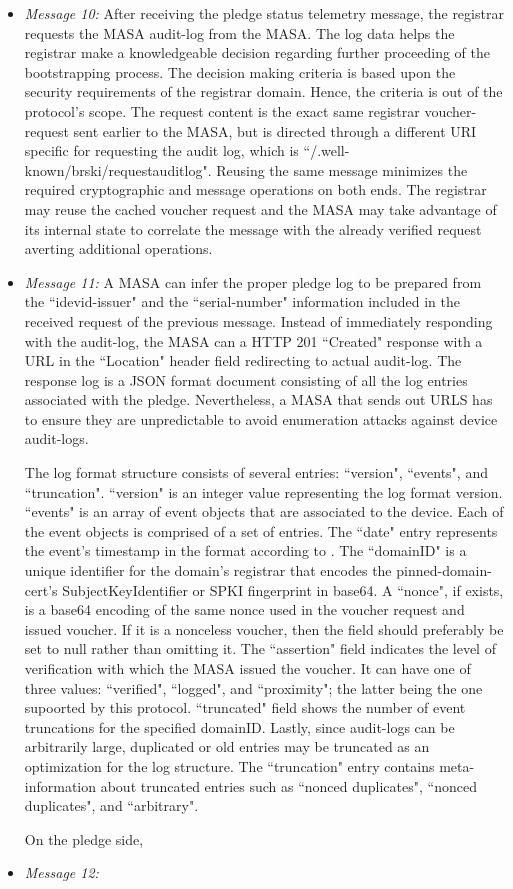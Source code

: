 \begin{itemize}
	\item \textit{Message 10:} After receiving the pledge status telemetry message, the registrar requests the MASA audit-log from the MASA. The log data helps the registrar make a knowledgeable decision regarding further proceeding of the bootstrapping process. The decision making criteria is based upon the security requirements of the registrar domain. Hence, the criteria is out of the protocol's scope.
	The request content is the exact same registrar voucher-request sent earlier to the MASA, but is directed through a different URI specific for requesting the audit log, which is ``/.well-known/brski/requestauditlog". Reusing the same message minimizes the required cryptographic and message operations on both ends. The registrar may reuse the cached voucher request and the MASA may take advantage of its internal state to correlate the message with the already verified request averting additional operations.
	
	\item \textit{Message 11:} 
	A MASA can infer the proper pledge log to be prepared from the ``idevid-issuer" and the ``serial-number" information included in the received request of the previous message. Instead of immediately responding with the audit-log, the MASA can a HTTP 201 ``Created" response with a URL in the ``Location" header field redirecting to actual audit-log. The response log is a JSON format document consisting of all the log entries associated with the pledge. Nevertheless, a MASA that sends out URLS has to ensure they are unpredictable to avoid enumeration attacks against device audit-logs.
	\par
	The log format structure consists of several entries: ``version", ``events", and ``truncation". ``version" is an integer value representing the log format version. ``events" is an array of event objects that are associated to the device. 
	Each of the event objects is comprised of a set of entries. The ``date" entry represents the event's timestamp in the format according to \cite{rfc3339}. 
	The ``domainID" is a unique identifier for the domain's registrar that encodes the pinned-domain-cert's SubjectKeyIdentifier or SPKI fingerprint in base64. A ``nonce", if exists, is a base64 encoding of the same nonce used in the voucher request and issued voucher. If it is a nonceless voucher, then the field should preferably be set to null rather than omitting it. 
	The ``assertion" field indicates the level of verification with which the MASA issued the voucher. It can have one of three values: ``verified", ``logged", and ``proximity"; the latter being the one supoorted by this protocol.
	``truncated" field shows the number of event truncations for the specified domainID.
	Lastly, since audit-logs can be arbitrarily large, duplicated or old entries may be truncated as an optimization for the log structure. The ``truncation" entry contains meta-information about truncated entries such as ``nonced duplicates", ``nonced duplicates", and ``arbitrary".
	\par
	On the pledge side, 
	
	\item \textit{Message 12:} 

	
\end{itemize}









